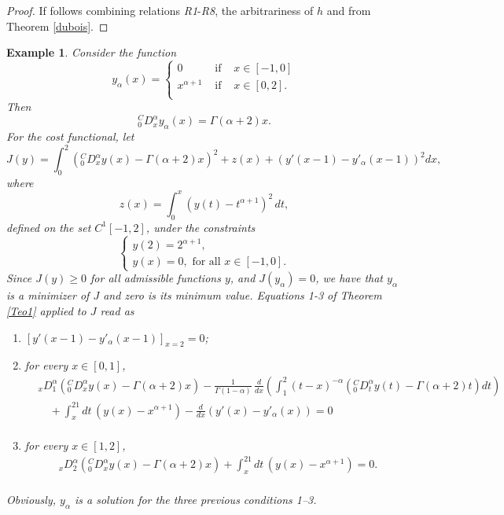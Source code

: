 \documentclass[10pt]{article}
\newtheorem{example}[theorem]{Example}
\begin{document}
\begin{proof} If follows combining relations \textit{R1}-\textit{R8}, the arbitrariness of $h$ and from Theorem \ref{dubois}.
\end{proof}

\begin{example}\label{example2}
Consider the function
$$y_\alpha(x)=\left\{
\begin{array}{lll}
0&\mbox{ if }& x\in[-1,0]\\
x^{\alpha+1}&\mbox{ if }& x\in[0,2].\\
\end{array}\right.$$
Then
$${^C_0D_x^\alpha}y_\alpha(x)=\Gamma(\alpha+2)x.$$
For the cost functional, let
\begin{equation}
\label{example}
J(y)=\int_0^2 ({^C_0D_x^\alpha}y(x)-\Gamma(\alpha+2)x)^2+z(x)+(y'(x-1)-y'_\alpha(x-1))^2dx,
\end{equation}
where
$$z(x)=\int_0^x (y(t)-t^{\alpha+1})^2 \, dt,$$
defined on the set $C^1[-1,2]$, under the constraints
$$\left\{
\begin{array}{l}
y(2)=2^{\alpha+1},\\
y(x)=0, \mbox{ for all } x\in [-1,0].
\end{array}\right.$$
Since $J(y)\geq0$ for all admissible functions $y$, and $J(y_\alpha)=0$, we have that $y_\alpha$ is a minimizer of $J$ and zero is its minimum value.
Equations \textit{1-3} of Theorem \ref{Teo1} applied to $J$ read as
\begin{enumerate}
\item $\displaystyle \left[y'(x-1)-y'_\alpha(x-1)\right]_{x=2}=0$;
\item for every $x\in[0,1]$,
\begin{align*}
&{_xD_1^\alpha}({^C_0D_x^\alpha}y(x)-\Gamma(\alpha+2)x)
- \frac{1}{\Gamma(1-\alpha)}\,\frac{d}{dx}\left( \int_{1}^2(t-x)^{-\alpha}({^C_0D_t^\alpha}y(t)-\Gamma(\alpha+2)t)dt\right)\\
&\quad +\int_x^21dt \, (y(x)-x^{\alpha+1})-\frac{d}{dx}\left(y'(x)-y'_\alpha(x)\right)=0\\
\end{align*}
\item for every $x\in[1,2]$,
\begin{align*}
&{_xD_2^\alpha}({^C_0D_x^\alpha}y(x)-\Gamma(\alpha+2)x)+\int_x^21dt \, (y(x)-x^{\alpha+1})=0.\\
\end{align*}
\end{enumerate}

Obviously, $y_\alpha$ is a solution for the three previous conditions 1--3.
\end{example}
\end{document}
